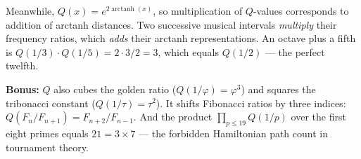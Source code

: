 \documentclass[11pt]{article}
\begin{document}
Meanwhile, $Q(x) = e^{2\operatorname{arctanh}(x)}$, so multiplication of $Q$-values
corresponds to addition of arctanh distances. Two successive musical intervals
\emph{multiply} their frequency ratios, which \emph{adds} their arctanh
representations. An octave plus a fifth is $Q(1/3) \cdot Q(1/5) = 2 \cdot 3/2 = 3$,
which equals $Q(1/2)$ --- the perfect twelfth.

\medskip

\noindent\textbf{Bonus:} $Q$ also cubes the golden ratio ($Q(1/\varphi) = \varphi^3$)
and squares the tribonacci constant ($Q(1/\tau) = \tau^2$). It shifts Fibonacci
ratios by three indices: $Q(F_n/F_{n+1}) = F_{n+2}/F_{n-1}$. And the product
$\prod_{p \leq 19} Q(1/p)$ over the first eight primes equals $21 = 3 \times 7$
--- the forbidden Hamiltonian path count in tournament theory.
\end{document}
